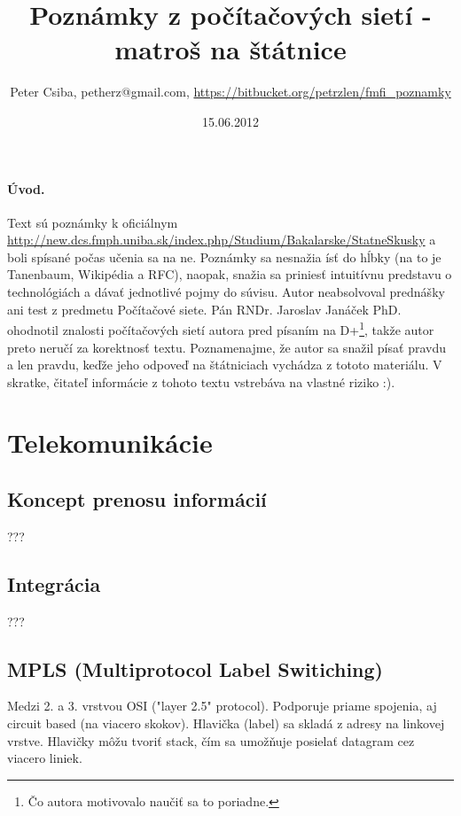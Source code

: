 \documentclass[10pt,a4paper]{article}
\title{Poznámky z počítačových sietí - matroš na štátnice}
\date{15.06.2012}
\author{Peter Csiba, petherz@gmail.com, \url{https://bitbucket.org/petrzlen/fmfi_poznamky}}
\begin{document}
\maketitle
\tableofcontents

\clearpage

\paragraph{Úvod.}   

Text sú poznámky k oficiálnym \href{štátnicovým otázkam}{http://new.dcs.fmph.uniba.sk/index.php/Studium/Bakalarske/StatneSkusky} a boli spísané počas učenia sa na ne.
Poznámky sa nesnažia ísť do hĺbky (na to je Tanenbaum, Wikipédia a RFC), naopak, snažia sa priniesť intuitívnu predstavu o technológiách a dávať jednotlivé pojmy do súvisu. 
Autor neabsolvoval prednášky ani test z predmetu Počítačové siete. Pán RNDr. Jaroslav Janáček PhD. ohodnotil znalosti počítačových sietí autora pred písaním na D+\footnote{
Čo autora motivovalo naučiť sa to poriadne. 
}, takže autor preto neručí za korektnosť textu.
Poznamenajme, že autor sa snažil písať pravdu a len pravdu, keďže jeho odpoveď na štátniciach vychádza z tototo materiálu. V skratke, čitateľ informácie z tohoto textu vstrebáva na vlastné riziko :).

\section{Telekomunikácie}           
\subsection{Koncept prenosu informácií} 
???

\subsection{Integrácia}
???
               
\subsection{MPLS (Multiprotocol Label Switiching)}
Medzi 2. a 3. vrstvou OSI ("layer 2.5" protocol). 
Podporuje priame spojenia, aj circuit based (na viacero skokov).
Hlavička (label) sa skladá z adresy na linkovej vrstve. Hlavičky môžu tvoriť stack, čím sa umožňuje posielať datagram cez viacero liniek.
\end{document}
